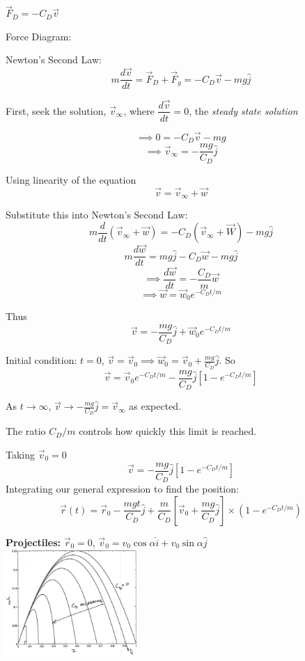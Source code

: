 \begin{example}
\vspace*{80pt}	

$\vec{F}_D = -C_D\vec{v}$

Force Diagram:

\vspace*{80pt}	


Newton's Second Law:
\[m\frac{d\vec{v}}{dt} = \vec{F}_D + \vec{F}_g = -C_D\vec{v} - mg\hat{j}\]

First, seek the solution, $\vec{v}_{\infty}$, where $\dfrac{d\vec{v}}{dt} = 0$, the \emph{steady state solution}

\[\implies 0 =  -C_D\vec{v} - mg\]
\[\implies \vec{v}_{\infty} = -\frac{mg}{C_D}\hat{j}\]

Using linearity of the equation
\[\vec{v} = \vec{v}_{\infty} + \vec{w}\]

Substitute this into Newton's Second Law:
\[m\frac{d}{dt}(\vec{v}_{\infty} + \vec{w}) = -C_D(\vec{v}_{\infty} + \vec{W}) - mg\hat{j}\]
\[m\frac{d\vec{w}}{dt} = mg\hat{j} -C_D\vec{w} - mg\hat{j}\]
\[\implies \frac{d\vec{w}}{dt} = -\frac{C_D}{m}\vec{w} \]
\[\implies \vec{w} = \vec{w}_0e^{-C_Dt/m}\]

Thus 
\[\vec{v} = -\frac{mg}{C_D}\hat{j} + \vec{w}_0e^{-C_Dt/m}\]

Initial condition: $t= 0$, $\vec{v} = \vec{v}_0 \implies \vec{w}_0 = \vec{v}_0 + \frac{mg}{C_D}\hat{j}$. So
\[\vec{v} = \vec{v}_0e^{-C_Dt/m} - \frac{mg}{C_D}\hat{j}[1-e^{-C_Dt/m}]\]

As $t \to \infty$, $\vec{v} \to -\frac{mg}{C_D}\hat{j} = \vec{v}_{\infty}$ as expected.

The ratio $C_D/m$ controls how quickly this limit is reached. 

Taking $\vec{v}_0 = 0$
\[\vec{v} = -\frac{mg}{C_D}\hat{j}[1 - e^{-C_Dt/m}]\]
\vspace*{100pt}
Integrating our general expression to find the position:
\[\vec{r}(t) = \vec{r}_0 - \frac{mgt}{C_D}\hat{j} + \frac{m}{C_D}[\vec{v}_0 + \frac{mg}{C_D}\hat{j}]\times(1-e^{-C_Dt/m})\]

\textbf{Projectiles:} $\vec{r}_0 = 0$, $\vec{v}_0 = v_0\cos\alpha\hat{i} + v_0\sin\alpha\hat{j}$\\[4cm]


\hspace*{2cm}\includegraphics[width=5cm]{drag.jpg}
\end{example}


